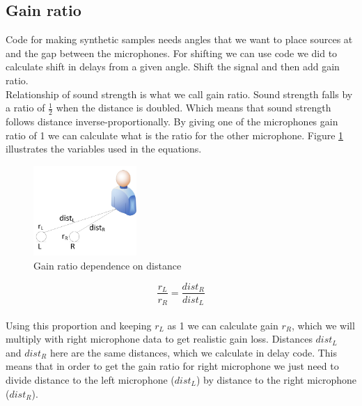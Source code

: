   \subsection{Gain ratio}
  Code for making synthetic samples needs angles that we want to place sources at and the gap between the 
microphones. For shifting we can use code we did to calculate shift in delays from a given angle. Shift the signal 
and then add gain ratio. \\
  Relationship of sound strength is what we call gain ratio. Sound strength falls by a ratio of \( \frac{1}{2}
\) when the distance is doubled. Which means that sound strength follows distance inverse-proportionally. 
  By giving one of the microphones gain ratio of 1 we can calculate what is the ratio for the other 
microphone. Figure \ref{fig:ratioDependence} illustrates the variables used in the equations.
\begin{figure}[htp]
	\centering
	\includegraphics[width=0.35\textwidth]{Illustrations/gainRatio.jpg}
	\caption{Gain ratio dependence on distance}
	\label{fig:ratioDependence}
\end{figure}
 \[\frac{r_L}{r_R} = \frac{dist_R}{dist_L} \]\\
Using this proportion and keeping \(r_L\) as 1 we can calculate gain \(r_R\), which we will multiply with 
right microphone data to get realistic gain loss. Distances \(dist_L\) and \(dist_R\) here are the same 
distances, which we calculate in delay code. This means that in order to get the gain ratio for right 
microphone we just need to divide distance to the left microphone (\(dist_L\)) by distance to the right 
microphone (\(dist_R\)).